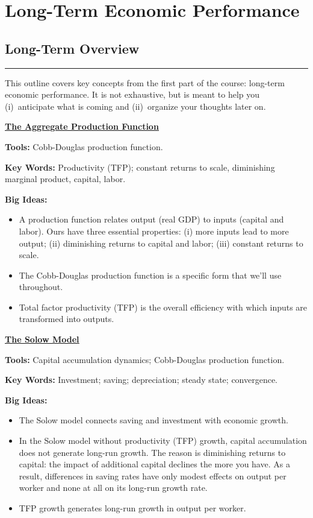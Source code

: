 \part{Long-Term Economic Performance}

\chapter*{Long-Term Overview}
\hypertarget{lrp}{}

\rule{\textwidth}{1pt}

This outline covers key concepts from the first part of the course:
long-term economic performance.
It is not exhaustive, but is meant to help you
(i)~anticipate what is coming and
(ii)~organize your thoughts later on.

\medskip
\hyperref[chp:agpf]{\textbf{\underline{The Aggregate Production Function}}}

\textbf{Tools:} Cobb-Douglas production function.

\textbf{Key Words:} Productivity (TFP); constant returns to scale, diminishing marginal product, capital, labor.

\textbf{Big Ideas:}
\vspace{-0.1in}
\begin{itemize}
\item A production function relates output (real GDP) to inputs (capital and labor).
Ours have three essential properties: (i) more inputs lead to more output;
(ii) diminishing returns to capital and labor; (iii) constant returns to scale.

\item The Cobb-Douglas production function is a specific form that we'll use throughout.
\item Total factor productivity (TFP) is the overall efficiency with which inputs are transformed into outputs.
\end{itemize}


\hyperref[chp:solo]{\textbf{\underline{The Solow Model}}}

\textbf{Tools:} Capital accumulation dynamics; Cobb-Douglas production function.

\textbf{Key Words:} Investment; saving; depreciation; steady state; convergence.

\textbf{Big Ideas:}
\vspace{-0.1in}
\begin{itemize}
\item The Solow model connects saving and investment with economic growth.
\item In the Solow model without productivity (TFP) growth,
capital accumulation does not generate long-run growth.
The reason is diminishing returns to capital:  
the impact of additional capital declines the more you have.
    As a result, differences in saving rates have only modest effects on output per worker 
    and none at all on its long-run growth rate.  
\item TFP growth generates long-run growth in output per worker.
\end{itemize}



